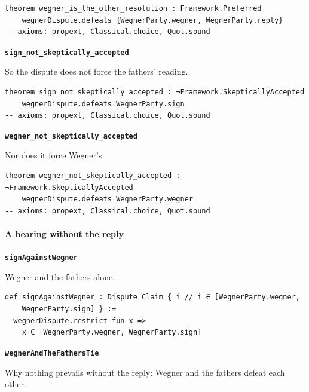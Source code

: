 \documentclass[11pt]{article}
\begin{document}
{\small\begin{verbatim}
theorem wegner_is_the_other_resolution : Framework.Preferred
    wegnerDispute.defeats {WegnerParty.wegner, WegnerParty.reply}
-- axioms: propext, Classical.choice, Quot.sound
\end{verbatim}}
\par\medskip\noindent\textbf{\texttt{sign\_\allowbreak{}not\_\allowbreak{}skeptically\_\allowbreak{}accepted}}\par\nobreak\noindent
So the dispute does not force the fathers’ reading.

{\small\begin{verbatim}
theorem sign_not_skeptically_accepted : ¬Framework.SkepticallyAccepted
    wegnerDispute.defeats WegnerParty.sign
-- axioms: propext, Classical.choice, Quot.sound
\end{verbatim}}
\par\medskip\noindent\textbf{\texttt{wegner\_\allowbreak{}not\_\allowbreak{}skeptically\_\allowbreak{}accepted}}\par\nobreak\noindent
Nor does it force Wegner’s.

{\small\begin{verbatim}
theorem wegner_not_skeptically_accepted : ¬Framework.SkepticallyAccepted
    wegnerDispute.defeats WegnerParty.wegner
-- axioms: propext, Classical.choice, Quot.sound
\end{verbatim}}
\paragraph*{A hearing without the reply}
\leavevmode\par\nobreak
\par\medskip\noindent\textbf{\texttt{sign\allowbreak{}Against\allowbreak{}Wegner}}\par\nobreak\noindent
Wegner and the fathers alone.

{\small\begin{verbatim}
def signAgainstWegner : Dispute Claim { i // i ∈ [WegnerParty.wegner,
    WegnerParty.sign] } :=
  wegnerDispute.restrict fun x =>
    x ∈ [WegnerParty.wegner, WegnerParty.sign]
\end{verbatim}}
\par\medskip\noindent\textbf{\texttt{wegner\allowbreak{}And\allowbreak{}The\allowbreak{}Fathers\allowbreak{}Tie}}\par\nobreak\noindent
Why nothing prevails without the reply: Wegner and the fathers defeat each other.
\end{document}
